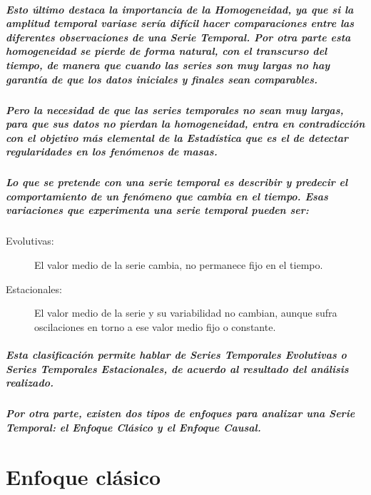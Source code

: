 \paragraph{
Esto último destaca la importancia de la \emph{Homogeneidad}, ya que si la amplitud temporal variase sería difícil hacer comparaciones entre las diferentes observaciones de una Serie Temporal. Por otra parte esta homogeneidad se pierde de forma natural, con el transcurso del tiempo, de manera que cuando las series son muy largas no hay garantía de que los datos iniciales y finales sean comparables.
}
\paragraph{
Pero la necesidad de que las series temporales no sean muy largas, para que sus datos no pierdan la homogeneidad, entra en contradicción con el objetivo más elemental de la Estadística que es el de detectar regularidades en los fenómenos de masas.
}
\paragraph{
Lo que se pretende con una serie temporal es describir y predecir el comportamiento de un fenómeno que cambia en el tiempo. Esas variaciones que experimenta una serie temporal pueden ser:
}
\begin{description}
\item[Evolutivas:] El valor medio de la serie cambia, no permanece fijo en el tiempo.
\item[Estacionales:] El valor medio de la serie y su variabilidad no cambian, aunque sufra oscilaciones en torno a ese valor medio fijo o constante.
\end{description}
\paragraph{
Esta clasificación permite hablar de Series Temporales Evolutivas o Series Temporales Estacionales, de acuerdo al resultado del análisis realizado.
}
\paragraph{
Por otra parte, existen dos tipos de enfoques para analizar una Serie Temporal: el \emph{Enfoque Clásico} y el \emph{Enfoque Causal}.
}




\chapter{Enfoque clásico}
